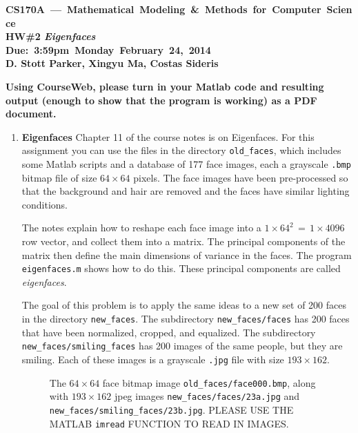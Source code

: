 \documentclass[10pt]{article}
\begin{document}
\begin{center}
{\bf
\mbox{CS170A --- Mathematical Modeling \& Methods for Computer Science} \\
HW\#2 {\it Eigenfaces} \\
\mbox{Due: 3:59pm Monday February 24, 2014} \\ 
\vspace*{2 mm}
D. Stott Parker, Xingyu Ma, Costas Sideris
}
\end{center}

{\bf
Using CourseWeb, please turn in your Matlab code and resulting output
(enough to show that the program is working) as a PDF document.
}
\medskip

\noindent

\begin{enumerate}

\item {\bf Eigenfaces}
Chapter 11 of the course notes is on Eigenfaces.
For this assignment you can use the files in the directory \verb"old_faces",
which includes some Matlab scripts and a database of 177 face images,
each a grayscale \verb".bmp" bitmap file of size $64 \times 64$ pixels.
The face images have been pre-processed so that the background
and hair are removed and the faces have similar lighting conditions.

The notes explain how to
reshape each face image into a $1 \times 64^2 \, = \, 1 \times 4096$ row vector, and collect them into a matrix.
The principal components of the matrix then define the main dimensions of variance in the faces.
The program \verb"eigenfaces.m" shows how to do this.
These principal components are called \emph{eigenfaces}.

\bigskip

The goal of this problem is to apply the same ideas to a new set of 200 faces in the directory \verb"new_faces".
The subdirectory \verb"new_faces/faces" has 200 faces that have been normalized, cropped, and equalized.
The subdirectory \verb"new_faces/smiling_faces" has 200 images of the same people, but they are smiling.
Each of these images is a grayscale \verb".jpg" file with size $193 \times 162$.

\begin{figure}[!htb]
\centerline{
\hspace{1in}
\hspace{0.5in}
}
\caption{The $64 \times 64$ face bitmap image {\tt old\_faces/face000.bmp}, along with $193 \times 162$ jpeg images {\tt new\_faces/faces/23a.jpg}
and {\tt new\_faces/smiling\_faces/23b.jpg}.  PLEASE USE THE MATLAB {\tt imread} FUNCTION TO READ IN IMAGES.}
\end{figure}





\end{enumerate}
\end{document}
